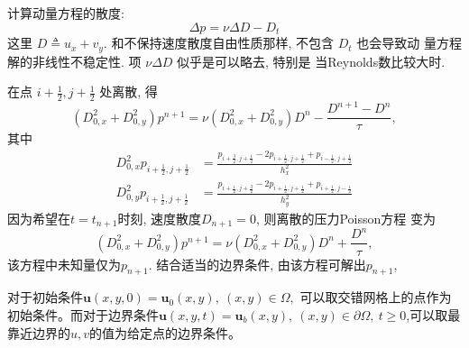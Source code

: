 \documentclass[12pt]{article}
\begin{document}
计算动量方程的散度:
\begin{equation}
	\Delta p=\nu \Delta D-D_{t}
\end{equation}
这里 $D \triangleq u_{x}+v_{y} .$ 和不保持速度散度自由性质那样, 不包含 $D_{t}$ 也会导致动 量方程解的非线性不稳定性. 项 $\nu \Delta D$ 似乎是可以略去, 特别是 当Reynolds数比较大时.

在点 $i+\frac{1}{2}, j+\frac{1}{2}$ 处离散, 得
\begin{equation}
	\left(D_{0, x}^{2}+D_{0, y}^{2}\right) p^{n+1}=  \nu\left(D_{0, x}^{2}+D_{0, y}^{2}\right) D^{n}-\frac{D^{n+1}-D^{n}}{\tau},
\end{equation}
其中
\begin{equation}
	\begin{aligned}
		D_{0, x}^{2} p_{i+\frac{1}{2}, j+\frac{1}{2}} & =\frac{p_{i+\frac{3}{2}, j+\frac{1}{2}}-2 p_{i+\frac{1}{2}, j+\frac{1}{2}}+p_{i-\frac{1}{2}, j+\frac{1}{2}}}{h_{x}^{2}} \\
		D_{0, y}^{2} p_{i+\frac{1}{2}, j+\frac{1}{2}} & =\frac{p_{i+\frac{1}{2}, j+\frac{3}{2}}-2 p_{i+\frac{1}{2}, j+\frac{1}{2}}+p_{i+\frac{1}{2}, j-\frac{1}{2}}}{h_{y}^{2}}
	\end{aligned}
\end{equation}
因为希望在$t=t_{n+1}$时刻, 速度散度$D_{n+1} = 0$, 则离散的压力Poisson方程 变为
\begin{equation}
	\left(D_{0, x}^{2}+D_{0, y}^{2}\right) p^{n+1}=  \nu\left(D_{0, x}^{2}+D_{0, y}^{2}\right) D^{n}+\frac{D^{n}}{\tau},
\end{equation}
该方程中未知量仅为$p_{n+1}$. 结合适当的边界条件, 由该方程可解出$p_{n+1}$,



对于初始条件$\bm{u}(x, y, 0)=\bm{u}_{0}(x, y), \  (x, y) \in \Omega,$ 可以取交错网格上的点作为初始条件。而对于边界条件$\bm{u}(x, y, t)=\bm{u}_{b}(x, y), \  (x, y) \in \partial \Omega,\ t \geq 0$,可以取最靠近边界的$u,v$的值为给定点的边界条件。
\end{document}
